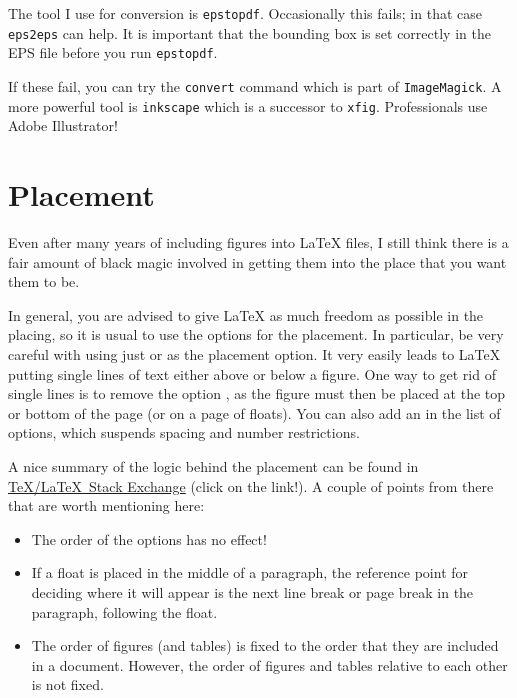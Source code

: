 The tool I use for conversion is \texttt{epstopdf}. Occasionally this
fails; in that case \texttt{eps2eps} can help. It is important that
the bounding box is set correctly in the EPS file before you run
\texttt{epstopdf}.

If these fail, you can try the \texttt{convert} command which is part
of \texttt{ImageMagick}. A more powerful tool is \texttt{inkscape}
which is a successor to \texttt{xfig}. Professionals use Adobe Illustrator!


\section{Placement}%
\label{sec:fig:placement}

Even after many years of including figures into \LaTeX{} files, I
still think there is a fair amount of black magic involved in getting
them into the place that you want them to be.

In general, you are advised to give \LaTeX{} as much freedom as
possible in the placing, so it is usual to use the options
\Option{[htbp]} for the placement.
In particular, be very careful with
using just \Option{[h]} or \Option{[H]} as the placement option. It very
easily leads to \LaTeX{} putting single lines of text either above or
below a figure.
One way to get rid of single lines is to remove the option ,
as the figure must then be placed at the top or bottom of the page
(or on a page of floats).
You can also add an \Option{!} in the list
of options, which suspends spacing and number restrictions.

A nice summary of the logic behind the placement can be found in
\href{http://tex.stackexchange.com/questions/39017/how-to-influence-the-position-of-float-environments-like-figure-and-table-in-lat}{\TeX/\LaTeX\ Stack Exchange} (click on the link!).
A couple of points from there that are worth mentioning here:
\begin{itemize}
\item The order of the options  has no effect!
\item If a float is placed in the middle of a paragraph,
  the reference point for deciding where it will appear is the next line break or page break in the paragraph,
  following the float.
\item The order of figures (and tables) is fixed to the order that they are included in a document.
  However, the order of figures and tables relative to each other is not fixed.
\end{itemize}

